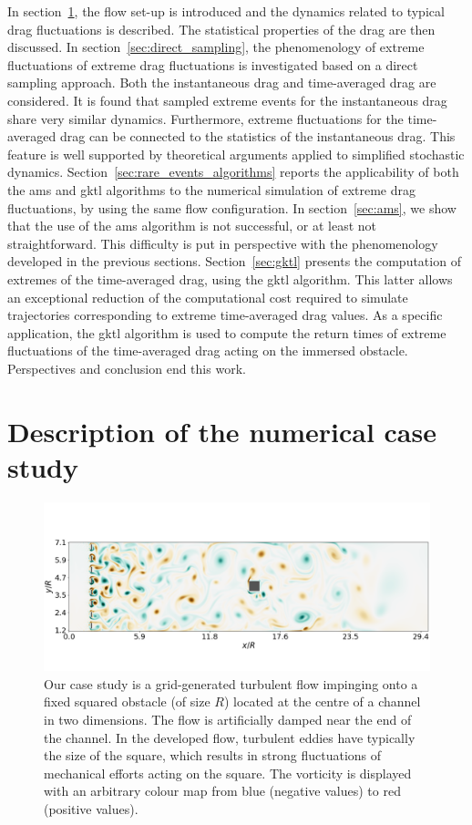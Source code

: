 \documentclass[pre,aps,floatfix,10pt,superscriptaddress, notitlepage,preprint]{revtex4-1}
\begin{document}
In section~\ref{sec:test_flow}, the flow set-up is introduced and the dynamics related to typical
drag fluctuations is described.
The statistical properties of the drag are then discussed.
In section~\ref{sec:direct_sampling}, the phenomenology of extreme fluctuations of extreme
drag fluctuations is investigated based on a direct sampling approach.
Both the instantaneous drag and time-averaged drag are considered.
It is found that sampled extreme events for the instantaneous drag share very similar dynamics. Furthermore, extreme fluctuations for the time-averaged drag can be connected to the statistics of the instantaneous drag.
This feature is well supported by theoretical arguments applied to simplified stochastic dynamics.
Section~\ref{sec:rare_events_algorithms} reports the applicability of both the \ac{ams} and \ac{gktl} algorithms to the numerical simulation of extreme drag fluctuations, by using the same flow configuration.
In section~\ref{sec:ams}, we show that the use of the \ac{ams} algorithm is not successful, or at least not straightforward. This difficulty is put in perspective with the phenomenology developed in the previous sections.
Section~\ref{sec:gktl} presents the computation of extremes of the time-averaged drag, using the \ac{gktl} algorithm.
This latter allows an exceptional reduction of the computational cost required to simulate trajectories corresponding to extreme time-averaged drag values.
As a specific application, the \ac{gktl} algorithm is used to compute the return times of extreme fluctuations of the time-averaged drag acting on the immersed obstacle.
Perspectives and conclusion end this work.
	
\section{Description of the numerical case study}
\label{sec:test_flow}
	
\begin{figure}
\centering
\includegraphics[width=\linewidth]{illustr_ecoulement/illustr_ecoulement}
\caption{Our case study is a grid-generated turbulent flow impinging onto a fixed squared obstacle (of size $R$) located at the centre of a channel in two dimensions. The flow is artificially damped near the end of the channel. In the developed flow, turbulent eddies have typically the size of the square, which results in strong fluctuations of mechanical efforts acting on the square. The vorticity is displayed with an arbitrary colour map from blue (negative values) to red (positive values).}
\label{fig:illustr_ecoulement}
\end{figure}
	
\end{document}
